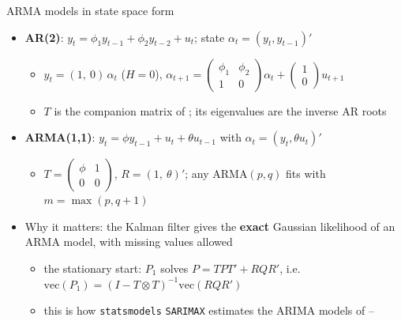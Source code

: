 \begin{frame}{ARMA models in state space form}
\itemsize{\small}
\begin{itemize}
    \item \textbf{AR(2)}: $y_t = \phi_1y_{t-1} + \phi_2y_{t-2} + u_t$; state $\alpha_t = (y_t, y_{t-1})'$
    \begin{itemize}
        \item $y_t = (1,\ 0)\,\alpha_t$ ($H = 0$), \quad $\alpha_{t+1} = \begin{pmatrix}\phi_1 & \phi_2\\ 1 & 0\end{pmatrix}\alpha_t + \begin{pmatrix}1\\ 0\end{pmatrix}u_{t+1}$
        \item $T$ is the companion matrix of ; its eigenvalues are the inverse AR roots
    \end{itemize}
    \item \textbf{ARMA(1,1)}: $y_t = \phi y_{t-1} + u_t + \theta u_{t-1}$ with $\alpha_t = (y_t, \theta u_t)'$
    \begin{itemize}
        \item $T = \begin{pmatrix}\phi & 1\\ 0 & 0\end{pmatrix}$, $R = (1,\ \theta)'$; any ARMA$(p,q)$ fits with $m = \max(p, q+1)$
    \end{itemize}
    \item Why it matters: the Kalman filter gives the \textbf{exact} Gaussian likelihood of an ARMA model, with missing values allowed
    \begin{itemize}
        \item the stationary start: $P_1$ solves $P = TPT' + RQR'$, i.e.\ $\mathrm{vec}(P_1) = (I - T \otimes T)^{-1}\mathrm{vec}(RQR')$
        \item this is how \texttt{statsmodels} \texttt{SARIMAX} estimates the ARIMA models of --
    \end{itemize}
\end{itemize}
\end{frame}

